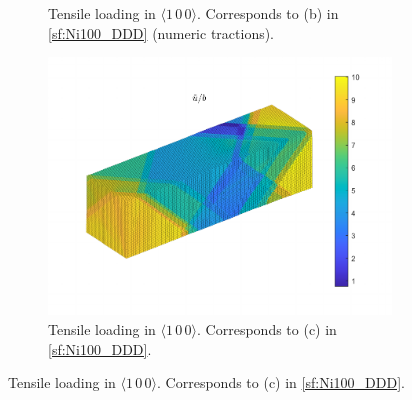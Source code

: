 \begin{figure}
\begin{subfigure}[t]{0.45\linewidth}
        \caption{Tensile loading in $\langle 1\, 0\, 0 \rangle$. Corresponds to (b) in \cref{sf:Ni100_DDD} (numeric tractions).}
        \label{sf:Ni100aN_disp}
    \end{subfigure}

    \begin{subfigure}[t]{0.45\linewidth}
        \centering
        \includegraphics[width=\linewidth]{../data/16-Mar-2021_8_tensile_ni_100_214400_disp.pdf}
        \caption{Tensile loading in $\langle 1\, 0\, 0 \rangle$. Corresponds to (c) in \cref{sf:Ni100_DDD}.}
        \label{sf:Ni100b_disp}
    \end{subfigure}


\end{figure}
